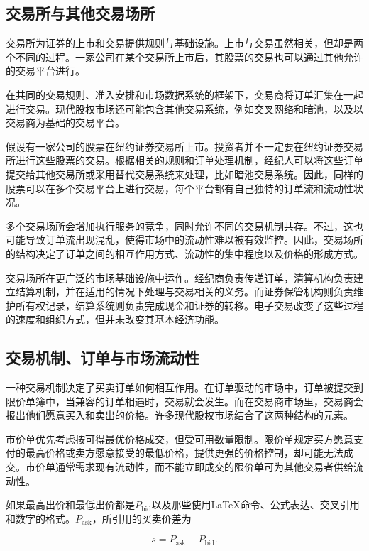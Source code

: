 \subsection{交易所与其他交易场所}

交易所为证券的上市和交易提供规则与基础设施。上市与交易虽然相关，但却是两个不同的过程。一家公司在某个交易所上市后，其股票的交易也可以通过其他允许的交易平台进行。

在共同的交易规则、准入安排和市场数据系统的框架下，交易商将订单汇集在一起进行交易。现代股权市场还可能包含其他交易系统，例如交叉网络和暗池，以及以交易商为基础的交易平台。

假设有一家公司的股票在纽约证券交易所上市。投资者并不一定要在纽约证券交易所进行这些股票的交易。根据相关的规则和订单处理机制，经纪人可以将这些订单提交给其他交易所或采用替代交易系统来处理，比如暗池交易系统。因此，同样的股票可以在多个交易平台上进行交易，每个平台都有自己独特的订单流和流动性状况。

多个交易场所会增加执行服务的竞争，同时允许不同的交易机制共存。不过，这也可能导致订单流出现混乱，使得市场中的流动性难以被有效监控。因此，交易场所的结构决定了订单之间的相互作用方式、流动性的集中程度以及价格的形成方式。

交易场所在更广泛的市场基础设施中运作。经纪商负责传递订单，清算机构负责建立结算机制，并在适用的情况下处理与交易相关的义务。而证券保管机构则负责维护所有权记录，结算系统则负责完成现金和证券的转移。电子交易改变了这些过程的速度和组织方式，但并未改变其基本经济功能。

\subsection{交易机制、订单与市场流动性}

一种交易机制决定了买卖订单如何相互作用。在订单驱动的市场中，订单被提交到限价单簿中，当兼容的订单相遇时，交易就会发生。而在交易商市场里，交易商会报出他们愿意买入和卖出的价格。许多现代股权市场结合了这两种结构的元素。

市价单优先考虑按可得最优价格成交，但受可用数量限制。限价单规定买方愿意支付的最高价格或卖方愿意接受的最低价格，提供更强的价格控制，却可能无法成交。市价单通常需求现有流动性，而不能立即成交的限价单可为其他交易者供给流动性。

如果最高出价和最低出价都是\(P_{\mathrm{bid}}\)以及那些使用LaTeX命令、公式表达、交叉引用和数字的格式。\(P_{\mathrm{ask}}\)，所引用的买卖价差为

\begin{equation*}
s=P_{\mathrm{ask}}-P_{\mathrm{bid}}.
\label{eq:ch9-bid-ask-spread}
\end{equation*}

